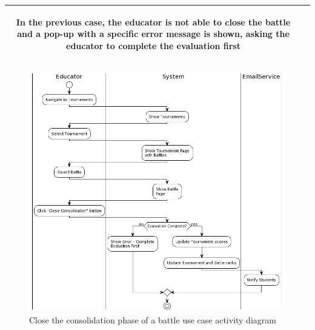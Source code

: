 \begin{center}
\begin{tabular}{ |c|m{10cm}| }
\begin{itemize}
        \end{itemize} 
        In the previous case, the educator is not able to close the battle and a pop-up with a specific error message is shown, asking the educator to complete the evaluation first \\
        \hline
    \end{tabular}
    \begin{figure}[H]
        \hspace{-10px}
        \includegraphics[scale=0.5]{Diagrams/activity_closebattleconsolidationphase.png}
        \caption{Close the consolidation phase of a battle use case activity diagram}
    \end{figure}
\end{center}

